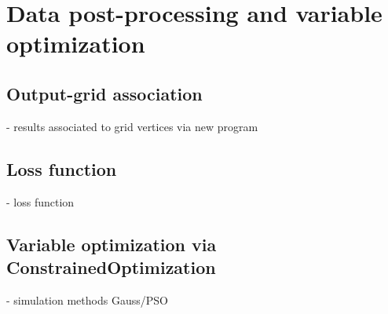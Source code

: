 \section{Data post-processing and variable optimization}

\subsection{Output-grid association}
- results associated to grid vertices via new program

\subsection{Loss function}
- loss function\\

\subsection{Variable optimization via ConstrainedOptimization}
- simulation methods Gauss/PSO
